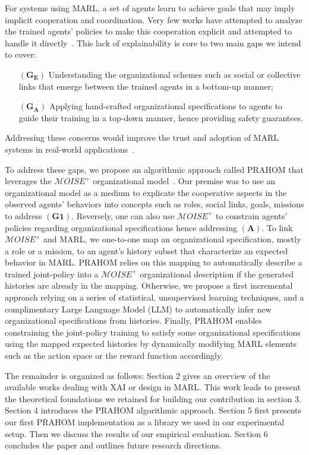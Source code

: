 \documentclass[runningheads]{llncs}
\begin{document}
For systems using MARL, a set of agents learn to achieve goals that may imply implicit cooperation and coordination. Very few works have attempted to analyze the trained agents' policies to make this cooperation explicit and attempted to handle it directly~\cite{albrecht2018survey,perolat2017pool}. This lack of explainability is core to two main gaps we intend to cover:
%
\begin{itemize}[wide, labelsep = 1em]
    \item[$(\mathbf{G_E})$] Understanding the organizational schemes such as social or collective links that emerge between the trained agents in a bottom-up manner;
    \item[$(\mathbf{G_A})$] Applying hand-crafted organizational specifications to agents to guide their training in a top-down manner, hence providing safety guarantees.
\end{itemize}
%
Addressing these concerns would improve the trust and adoption of MARL systems in real-world applications~\cite{kok2006collaborative,omidshafiei2019learning}.

To address these gaps, we propose an algorithmic approach called PRAHOM that leverages the $\mathcal{M}OISE^+$ organizational model~\cite{Hubner2007}. Our premise was to use an organizational model as a medium to explicate the cooperative aspects in the observed agents' behaviors into concepts such as roles, social links, goals, missions to address $(\mathbf{G1})$. Reversely, one can also use $\mathcal{M}OISE^+$ to constrain agents' policies regarding organizational specifications hence addressing $(\mathbf{A})$. To link $\mathcal{M}OISE^+$ and MARL, we one-to-one map an organizational specification, mostly a role or a mission, to an agent's history subset that characterize an expected behavior in MARL. PRAHOM relies on this mapping to automatically describe a trained joint-policy into a $\mathcal{M}OISE^+$ organizational description if the generated histories are already in the mapping. Otherwise, we propose a first incremental approach relying on a series of statistical, unsupervised learning techniques, and a complimentary Large Language Model (LLM) to automatically infer new organizational specifications from histories. Finally, PRAHOM enables constraining the joint-policy training to satisfy some organizational specifications using the mapped expected histories by dynamically modifying MARL elements such as the action space or the reward function accordingly.

The remainder is organized as follows: Section 2 gives an overview of the available works dealing with XAI or design in MARL. This work leads to present the theoretical foundations we retained for building our contribution in section 3. Section 4 introduces the PRAHOM algorithmic approach. Section 5 first presents our first PRAHOM implementation as a library we used in our experimental setup. Then we discuss the results of our empirical evaluation. Section 6 concludes the paper and outlines future research directions.
\end{document}
